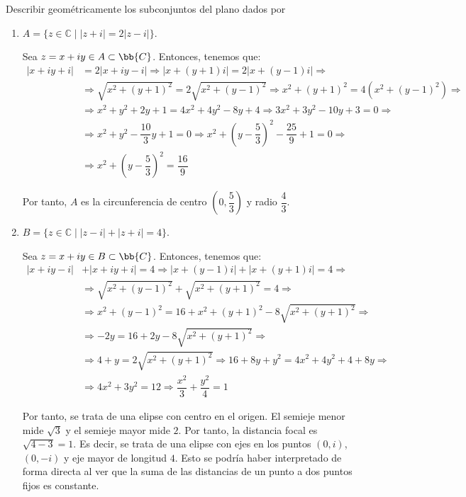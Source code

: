 \begin{ejercicio}
    Describir geométricamente los subconjuntos del plano dados por
    \begin{enumerate}
        \item $A = \{z \in \mathbb{C} \mid |z+i| = 2|z-i|\}$.
        
        Sea $z=x+iy\in A\subset \bb{C}$. Entonces, tenemos que:
        \begin{align*}
            |x+iy+i| &= 2|x+iy-i| \Longrightarrow
            |x+(y+1)i| = 2|x+(y-1)i| \Longrightarrow\\&\Longrightarrow
            \sqrt{x^2+(y+1)^2} = 2\sqrt{x^2+(y-1)^2} \Longrightarrow
            x^2+(y+1)^2 = 4(x^2+(y-1)^2) \Longrightarrow\\&\Longrightarrow
            x^2+y^2+2y+1 = 4x^2+4y^2-8y+4 \Longrightarrow
            3x^2+3y^2-10y+3 = 0 \Longrightarrow\\&\Longrightarrow
            x^2+y^2-\dfrac{10}{3}y+1 = 0
            \Longrightarrow
            x^2 + \left(y-\dfrac{5}{3}\right)^2 -\dfrac{25}{9}+1 = 0
            \Longrightarrow\\&\Longrightarrow
            x^2 + \left(y-\dfrac{5}{3}\right)^2 = \dfrac{16}{9}
        \end{align*}

        Por tanto, $A$ es la circunferencia de centro $\left(0,\dfrac{5}{3}\right)$ y radio $\dfrac{4}{3}$.
        \item $B = \{z \in \mathbb{C} \mid |z-i| + |z+i| = 4\}$.
        
        Sea $z=x+iy\in B\subset \bb{C}$. Entonces, tenemos que:
        \begin{align*}
            |x+iy-i| &+ |x+iy+i| = 4 \Longrightarrow
            |x+(y-1)i| + |x+(y+1)i| = 4 \Longrightarrow\\&\Longrightarrow
            \sqrt{x^2+(y-1)^2} + \sqrt{x^2+(y+1)^2} = 4
            \Longrightarrow\\&\Longrightarrow
            x^2+(y-1)^2 = 16 + x^2+(y+1)^2 - 8\sqrt{x^2+(y+1)^2}
            \Longrightarrow\\&\Longrightarrow
            -2y = 16 + 2y - 8\sqrt{x^2+(y+1)^2}
            \Longrightarrow\\&\Longrightarrow
            4+y=2\sqrt{x^2+(y+1)^2}
            \Longrightarrow
            16+8y+y^2=4x^2+4y^2+4+8y
            \Longrightarrow\\&\Longrightarrow
            4x^2 + 3y^2 = 12
            \Longrightarrow
            \dfrac{x^2}{3} + \dfrac{y^2}{4} = 1
        \end{align*}

        Por tanto, se trata de una elipse con centro en el origen. El semieje menor mide $\sqrt{3}$ y el semieje mayor mide $2$. Por tanto, la distancia focal es $\sqrt{4-3}=1$. Es decir, se trata de una elipse con ejes en los puntos $(0,i)$, $(0,-i)$ y eje mayor de longitud $4$. Esto se podría haber interpretado de forma directa al ver que la suma de las distancias de un punto a dos puntos fijos es constante.
    \end{enumerate}
\end{ejercicio}

